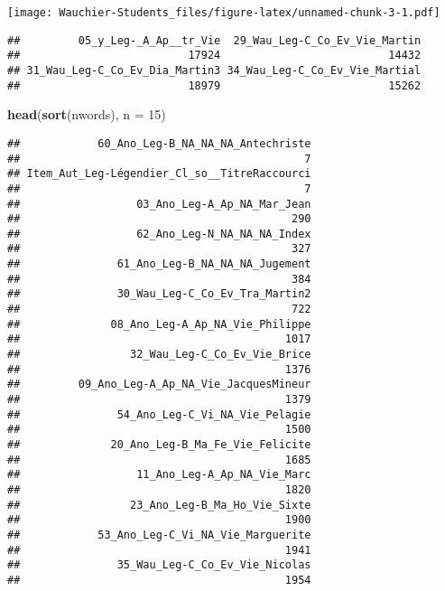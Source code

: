 \documentclass[]{article}
\newenvironment{Shaded}{\begin{snugshade}}{\end{snugshade}}
\newcommand{\DataTypeTok}[1]{\textcolor[rgb]{0.13,0.29,0.53}{#1}}
\newcommand{\DecValTok}[1]{\textcolor[rgb]{0.00,0.00,0.81}{#1}}
\newcommand{\KeywordTok}[1]{\textcolor[rgb]{0.13,0.29,0.53}{\textbf{#1}}}
\newcommand{\NormalTok}[1]{#1}
\newcommand{\OperatorTok}[1]{\textcolor[rgb]{0.81,0.36,0.00}{\textbf{#1}}}
\begin{document}
\begin{Shaded}
\end{Shaded}

\texttt{[image: Wauchier-Students\_files/figure-latex/unnamed-chunk-3-1.pdf]}

\begin{verbatim}
##         05_y_Leg-_A_Ap__tr_Vie  29_Wau_Leg-C_Co_Ev_Vie_Martin 
##                          17924                          14432 
## 31_Wau_Leg-C_Co_Ev_Dia_Martin3 34_Wau_Leg-C_Co_Ev_Vie_Martial 
##                          18979                          15262
\end{verbatim}

\begin{Shaded}
\begin{Highlighting}[]
\KeywordTok{head}\NormalTok{(}\KeywordTok{sort}\NormalTok{(nwords), }\DataTypeTok{n =} \DecValTok{15}\NormalTok{)}
\end{Highlighting}
\end{Shaded}

\begin{verbatim}
##            60_Ano_Leg-B_NA_NA_NA_Antechriste 
##                                            7 
## Item_Aut_Leg-Légendier_Cl_so__TitreRaccourci 
##                                            7 
##                  03_Ano_Leg-A_Ap_NA_Mar_Jean 
##                                          290 
##                  62_Ano_Leg-N_NA_NA_NA_Index 
##                                          327 
##               61_Ano_Leg-B_NA_NA_NA_Jugement 
##                                          384 
##               30_Wau_Leg-C_Co_Ev_Tra_Martin2 
##                                          722 
##              08_Ano_Leg-A_Ap_NA_Vie_Philippe 
##                                         1017 
##                 32_Wau_Leg-C_Co_Ev_Vie_Brice 
##                                         1376 
##         09_Ano_Leg-A_Ap_NA_Vie_JacquesMineur 
##                                         1379 
##               54_Ano_Leg-C_Vi_NA_Vie_Pelagie 
##                                         1500 
##              20_Ano_Leg-B_Ma_Fe_Vie_Felicite 
##                                         1685 
##                  11_Ano_Leg-A_Ap_NA_Vie_Marc 
##                                         1820 
##                 23_Ano_Leg-B_Ma_Ho_Vie_Sixte 
##                                         1900 
##            53_Ano_Leg-C_Vi_NA_Vie_Marguerite 
##                                         1941 
##               35_Wau_Leg-C_Co_Ev_Vie_Nicolas 
##                                         1954
\end{verbatim}
\end{document}
